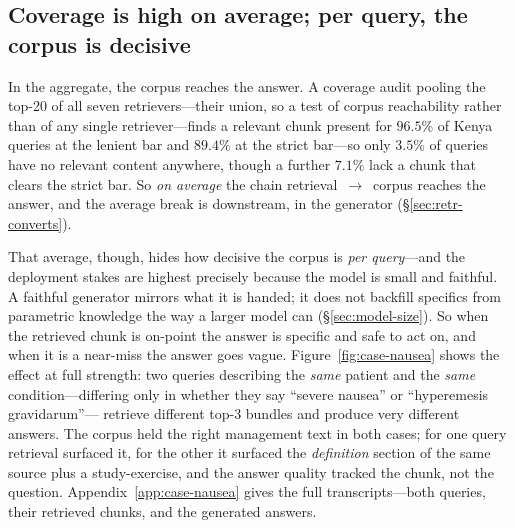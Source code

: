 \subsection{Coverage is high on average; per query, the corpus is decisive}
\label{sec:retr-corpus}

In the aggregate, the corpus reaches the answer. A coverage audit pooling the
top-20 of all seven retrievers---their union, so a test of corpus reachability
rather than of any single retriever---finds a relevant chunk present for
$96.5\%$ of Kenya queries at the lenient bar and $89.4\%$ at the strict
bar---so only $3.5\%$ of queries have no relevant content anywhere, though a
further $7.1\%$ lack a chunk that clears the strict bar. So \emph{on average} the chain
retrieval~$\to$~corpus reaches the answer, and the average break is downstream,
in the generator (\S\ref{sec:retr-converts}).

That average, though, hides how decisive the corpus is \emph{per query}---and
the deployment stakes are highest precisely because the model is small and
faithful. A faithful generator mirrors what it is handed; it does not backfill
specifics from parametric knowledge the way a larger model can
(\S\ref{sec:model-size}). So when the retrieved chunk is on-point the answer is
specific and safe to act on, and when it is a near-miss the answer goes vague.
Figure~\ref{fig:case-nausea} shows the effect at full strength: two queries
describing the \emph{same} patient and the \emph{same} condition---differing
only in whether they say ``severe nausea'' or ``hyperemesis gravidarum''---%
retrieve different top-3 bundles and produce very different answers. The corpus
held the right management text in both cases; for one query retrieval surfaced
it, for the other it surfaced the \emph{definition} section of the same source
plus a study-exercise, and the answer quality tracked the chunk, not the
question. Appendix~\ref{app:case-nausea} gives the full transcripts---both
queries, their retrieved chunks, and the generated answers.

